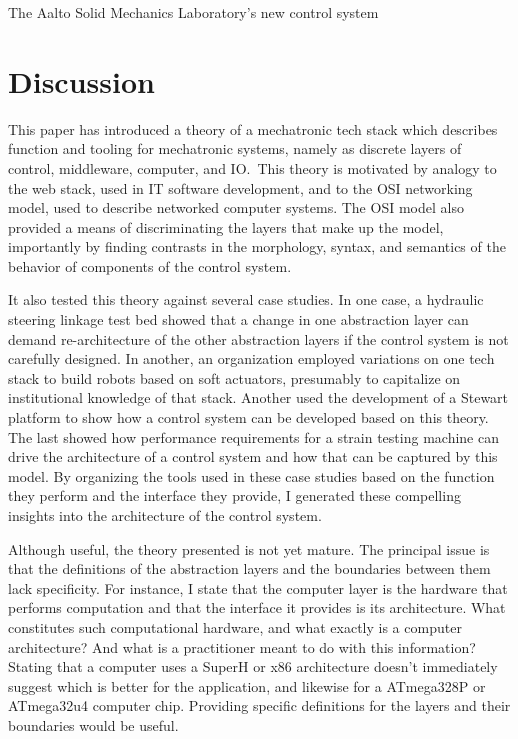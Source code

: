\documentclass[english,12pt,a4paper,pdftex,eng,utf8]{aaltothesis}
\begin{document}
The Aalto Solid Mechanics Laboratory's new control system

\clearpage


\section{Discussion}

This paper has introduced a theory of a mechatronic tech stack which describes function and tooling for mechatronic systems, namely as discrete layers of control, middleware, computer, and IO.\  This theory is motivated by analogy to the web stack, used in IT software development, and to the OSI networking model, used to describe networked computer systems.  The OSI model also provided a means of discriminating the layers that make up the model, importantly by finding contrasts in the morphology, syntax, and semantics of the behavior of components of the control system.

It also tested this theory against several case studies.  In one case, a hydraulic steering linkage test bed showed that a change in one abstraction layer can demand re-architecture of the other abstraction layers if the control system is not carefully designed.  In another, an organization employed variations on one tech stack to build robots based on soft actuators, presumably to capitalize on institutional knowledge of that stack.  Another used the development of a Stewart platform to show how a control system can be developed based on this theory.  The last showed how performance requirements for a strain testing machine can drive the architecture of a control system and how that can be captured by this model.  By organizing the tools used in these case studies based on the function they perform and the interface they provide, I generated these compelling insights into the architecture of the control system.

Although useful, the theory presented is not yet mature.  The principal issue is that the definitions of the abstraction layers and the boundaries between them lack specificity.  For instance, I state that the computer layer is the hardware that performs computation and that the interface it provides is its architecture.  What constitutes such computational hardware, and what exactly is a computer architecture?  And what is a practitioner meant to do with this information?  Stating that a computer uses a SuperH or x86 architecture doesn't immediately suggest which is better for the application, and likewise for a ATmega328P or ATmega32u4 computer chip.  Providing specific definitions for the layers and their boundaries would be useful.
\end{document}
